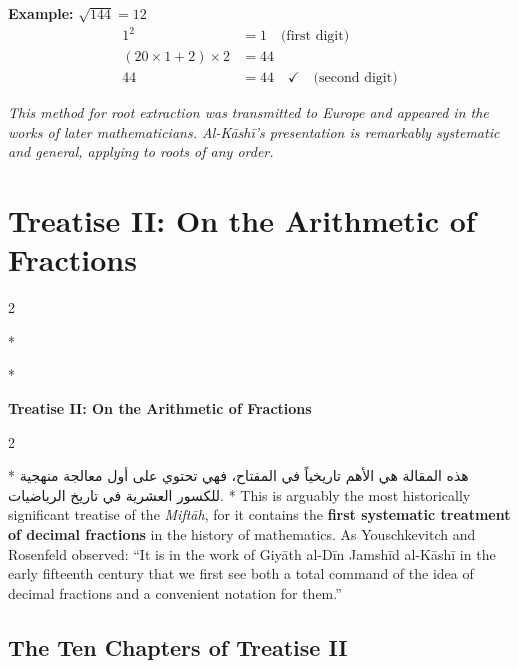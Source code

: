 \documentclass[11pt,a4paper]{article}
\newcommand{\cnote}[1]{\textcolor{notecolor}{\textit{#1}}}
\newcommand{\ar}[1]{{\arabicfont\beginR #1\endR}}
\newenvironment{bilingual}{%
  \vspace{0.3em}%
  \begin{paracol}{2}%
}{%
  \end{paracol}%
  \vspace{0.3em}%
}
\begin{document}
\noindent\textbf{Example:} $\sqrt{144} = 12$
\begin{align*}
1^2 &= 1 \quad \text{(first digit)} \\
(20 \times 1 + 2) \times 2 &= 44 \\
44 &= 44 \quad \checkmark \quad \text{(second digit)}
\end{align*}

\cnote{This method for root extraction was transmitted to Europe and
appeared in the works of later mathematicians. Al-K\=ash\=i's presentation
is remarkably systematic and general, applying to roots of any order.}
\clearpage

\section{Treatise II: On the Arithmetic of Fractions}
\label{sec:treatise2}

\begin{bilingual}
\switchcolumn[0]*
\begin{center}
\textbf{\Large\color{chapcolor}\ar{المقالة الثانية في حساب الكسور}}
\end{center}
\switchcolumn[1]*
\begin{center}
\textbf{\Large\color{chapcolor}Treatise II: On the Arithmetic of Fractions}
\end{center}
\end{bilingual}

\begin{bilingual}
\switchcolumn[0]*
\ar{هذه المقالة هي الأهم تاريخياً في المفتاح، فهي تحتوي على أول معالجة منهجية للكسور العشرية في تاريخ الرياضيات.}
\switchcolumn[1]*
This is arguably the most historically significant treatise of the
\textit{Mift\=ah}, for it contains the \textbf{first systematic
treatment of decimal fractions} in the history of mathematics. As
Youschkevitch and Rosenfeld observed: ``It is in the work of Giy\=ath
al-D\=in Jamsh\=id al-K\=ash\=i in the early fifteenth century that we first see
both a total command of the idea of decimal fractions and a convenient
notation for them.''
\end{bilingual}

\subsection{The Ten Chapters of Treatise II}
\end{document}
